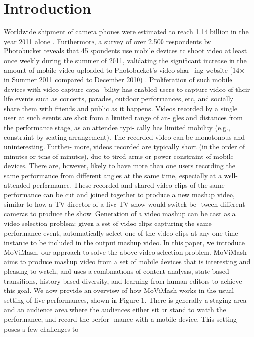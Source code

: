 \documentclass{sig-alternate}
\begin{document}
\section{Introduction}
Worldwide shipment of camera phones were estimated to reach
1.14 billion in the year 2011 alone \cite{salas:one}. Furthermore, a survey of
over 2,500 respondents by Photobucket reveals that 45%
spondents use mobile devices to shoot video at least once weekly
during the summer of 2011, validating the significant increase in
the amount of mobile video uploaded to Photobucket’s video shar-
ing website (14× in Summer 2011 compared to December 2010) \cite{salas:two}.
Proliferation of such mobile devices with video capture capa-
bility has enabled users to capture video of their life events such
as concerts, parades, outdoor performances, etc, and socially share
them with friends and public as it happens. Videos recorded by
a single user at such events are shot from a limited range of an-
gles and distances from the performance stage, as an attendee typi-
cally has limited mobility (e.g., constraint by seating arrangement).
The recorded video can be monotonous and uninteresting. Further-
more, videos recorded are typically short (in the order of minutes
or tens of minutes), due to tired arms or power constraint of mobile
devices. There are, however, likely to have more than one users
recording the same performance from different angles at the same
time, especially at a well-attended performance.
These recorded and shared video clips of the same performance
can be cut and joined together to produce a new mashup video,
similar to how a TV director of a live TV show would switch be-
tween different cameras to produce the show. Generation of a video
mashup can be cast as a video selection problem: given a set of
video clips capturing the same performance event, automatically
select one of the video clips at any one time instance to be included
in the output mashup video.
In this paper, we introduce MoViMash, our approach to solve
the above video selection problem. MoViMash aims to produce
mashup video from a set of mobile devices that is interesting and
pleasing to watch, and uses a combinations of content-analysis,
state-based transitions, history-based diversity, and learning from
human editors to achieve this goal.
We now provide an overview of how MoViMash works in the
usual setting of live performances, shown in Figure 1. There is
generally a staging area and an audience area where the audiences
either sit or stand to watch the performance, and record the perfor-
mance with a mobile device. This setting poses a few challenges to
\end{document}
